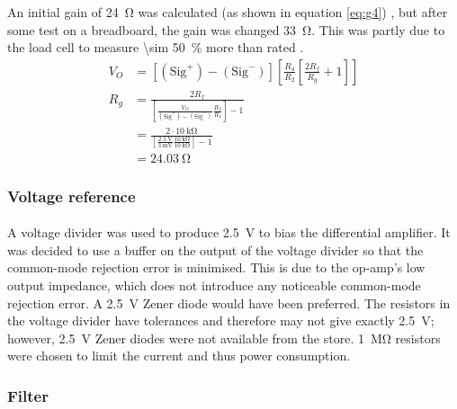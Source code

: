 \documentclass[twoside]{article}
\newcommand\ddfrac[2]{\frac{\displaystyle #1}{\displaystyle #2}}
\begin{document}
        An initial gain of \SI{24}{\ohm} was calculated (as shown in equation \eqref{eq:g4}) \cite{ti:sloa034}, but after some test on a breadboard, the gain was changed \SI{33}{\ohm}. This was partly due to the load cell to measure \SI{\sim 50}{\percent} more than rated \cite{htc:tal221}.
        \begin{align}
            V_{O} &= \left[ \left(\text{Sig}^{+}\right) - \left(\text{Sig}^{-}\right)\right]\left[\frac{R_{4}}{R_{2}} \left[\frac{2R_{f}}{R_{g}} + 1\right] \right] \label{eq:g1}\\
            R_{g} &= \ddfrac{2R_{f}}{\left[\frac{V_{O}}{\left(\text{Sig}^{+}\right) - \left(\text{Sig}^{-}\right)} \frac{R_{2}}{R_{4}} \right]-1} \label{eq:g2}\\
            &= \ddfrac{2 \cdot \SI{10}{\kilo\ohm}}{\left[\frac{\SI{2.5}{\volt}}{\SI{3}{\milli\volt}} \frac{\SI{10}{\kilo\ohm}}{\SI{10}{\kilo\ohm}} \right]-1} \label{eq:g3}\\
            &= \SI{24.03}{\ohm} \label{eq:g4}
        \end{align}

        \subsubsection{Voltage reference}
        \paragraph{}
        A voltage divider was used to produce \SI{2.5}{\volt} to bias the differential amplifier. It was decided to use a buffer on the output of the voltage divider so that the common-mode rejection error is minimised. This is due to the op-amp's low output impedance, which does not introduce any noticeable common-mode rejection error. A \SI{2.5}{\volt} Zener diode would have been preferred. The resistors in the voltage divider have tolerances and therefore may not give exactly \SI{2.5}{\volt}; however, \SI{2.5}{\volt} Zener diodes were not available from the store. \SI{1}{\mega\ohm} resistors were chosen to limit the current and thus power consumption.

        \subsubsection{Filter}
\end{document}
